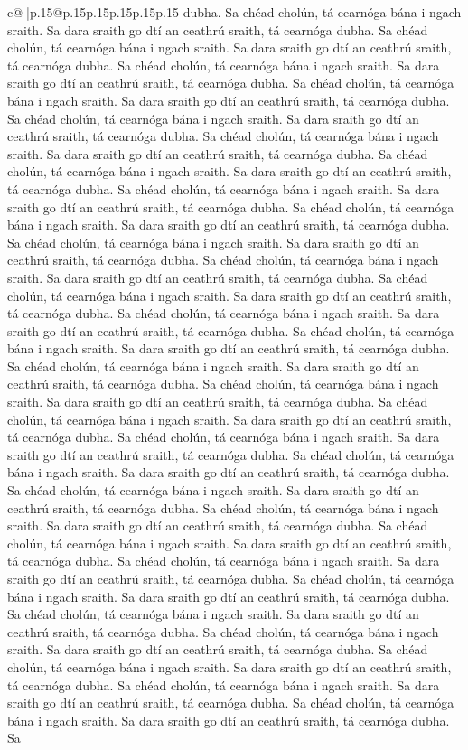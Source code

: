 \documentclass{article}
\begin{document}
{\begin{supertabular}{c@{$\;$}|p{.15\linewidth}@{}p{.15\linewidth}p{.15\linewidth}p{.15\linewidth}p{.15\linewidth}p{.15\linewidth}}
{{{dubha. Sa chéad cholún, tá cearnóga bána i ngach sraith. Sa dara sraith go dtí an ceathrú sraith, tá cearnóga dubha. Sa chéad cholún, tá cearnóga bána i ngach sraith. Sa dara sraith go dtí an ceathrú sraith, tá cearnóga dubha. Sa chéad cholún, tá cearnóga bána i ngach sraith. Sa dara sraith go dtí an ceathrú sraith, tá cearnóga dubha. Sa chéad cholún, tá cearnóga bána i ngach sraith. Sa dara sraith go dtí an ceathrú sraith, tá cearnóga dubha. Sa chéad cholún, tá cearnóga bána i ngach sraith. Sa dara sraith go dtí an ceathrú sraith, tá cearnóga dubha. Sa chéad cholún, tá cearnóga bána i ngach sraith. Sa dara sraith go dtí an ceathrú sraith, tá cearnóga dubha. Sa chéad cholún, tá cearnóga bána i ngach sraith. Sa dara sraith go dtí an ceathrú sraith, tá cearnóga dubha. Sa chéad cholún, tá cearnóga bána i ngach sraith. Sa dara sraith go dtí an ceathrú sraith, tá cearnóga dubha. Sa chéad cholún, tá cearnóga bána i ngach sraith. Sa dara sraith go dtí an ceathrú sraith, tá cearnóga dubha. Sa chéad cholún, tá cearnóga bána i ngach sraith. Sa dara sraith go dtí an ceathrú sraith, tá cearnóga dubha. Sa chéad cholún, tá cearnóga bána i ngach sraith. Sa dara sraith go dtí an ceathrú sraith, tá cearnóga dubha. Sa chéad cholún, tá cearnóga bána i ngach sraith. Sa dara sraith go dtí an ceathrú sraith, tá cearnóga dubha. Sa chéad cholún, tá cearnóga bána i ngach sraith. Sa dara sraith go dtí an ceathrú sraith, tá cearnóga dubha. Sa chéad cholún, tá cearnóga bána i ngach sraith. Sa dara sraith go dtí an ceathrú sraith, tá cearnóga dubha. Sa chéad cholún, tá cearnóga bána i ngach sraith. Sa dara sraith go dtí an ceathrú sraith, tá cearnóga dubha. Sa chéad cholún, tá cearnóga bána i ngach sraith. Sa dara sraith go dtí an ceathrú sraith, tá cearnóga dubha. Sa chéad cholún, tá cearnóga bána i ngach sraith. Sa dara sraith go dtí an ceathrú sraith, tá cearnóga dubha. Sa chéad cholún, tá cearnóga bána i ngach sraith. Sa dara sraith go dtí an ceathrú sraith, tá cearnóga dubha. Sa chéad cholún, tá cearnóga bána i ngach sraith. Sa dara sraith go dtí an ceathrú sraith, tá cearnóga dubha. Sa chéad cholún, tá cearnóga bána i ngach sraith. Sa dara sraith go dtí an ceathrú sraith, tá cearnóga dubha. Sa chéad cholún, tá cearnóga bána i ngach sraith. Sa dara sraith go dtí an ceathrú sraith, tá cearnóga dubha. Sa chéad cholún, tá cearnóga bána i ngach sraith. Sa dara sraith go dtí an ceathrú sraith, tá cearnóga dubha. Sa chéad cholún, tá cearnóga bána i ngach sraith. Sa dara sraith go dtí an ceathrú sraith, tá cearnóga dubha. Sa chéad cholún, tá cearnóga bána i ngach sraith. Sa dara sraith go dtí an ceathrú sraith, tá cearnóga dubha. Sa chéad cholún, tá cearnóga bána i ngach sraith. Sa dara sraith go dtí an ceathrú sraith, tá cearnóga dubha. Sa chéad cholún, tá cearnóga bána i ngach sraith. Sa dara sraith go dtí an ceathrú sraith, tá cearnóga dubha. Sa chéad cholún, tá cearnóga bána i ngach sraith. Sa dara sraith go dtí an ceathrú sraith, tá cearnóga dubha. Sa chéad cholún, tá cearnóga bána i ngach sraith. Sa dara sraith go dtí an ceathrú sraith, tá cearnóga dubha. Sa chéad cholún, tá cearnóga bána i ngach sraith. Sa dara sraith go dtí an ceathrú sraith, tá cearnóga dubha. Sa }}}
\end{supertabular}}
\end{document}
